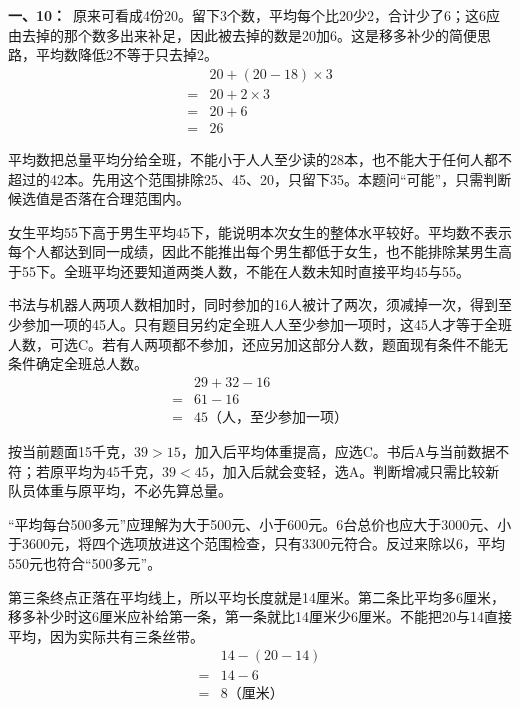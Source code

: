 \documentclass[multi=snippet,border=0pt]{standalone}
\newenvironment{snippet}[3]{\begin{minipage}{#1bp}\color{answerred}\fontsize{#2}{#3}\selectfont\raggedright}{\end{minipage}}
\begin{document}
\begin{snippet}{505}{11.5}{14}\textbf{一、10：}\ 原来可看成4份20。留下3个数，平均每个比20少2，合计少了6；这6应由去掉的那个数多出来补足，因此被去掉的数是20加6。这是移多补少的简便思路，平均数降低2不等于只去掉2。\[\begin{aligned}&20+(20-18)\times3\\={}&20+2\times3\\={}&20+6\\={}&26\end{aligned}\]\end{snippet}
\begin{snippet}{505}{11.5}{14}平均数把总量平均分给全班，不能小于人人至少读的28本，也不能大于任何人都不超过的42本。先用这个范围排除25、45、20，只留下35。本题问“可能”，只需判断候选值是否落在合理范围内。\end{snippet}
\begin{snippet}{505}{11.5}{14}女生平均55下高于男生平均45下，能说明本次女生的整体水平较好。平均数不表示每个人都达到同一成绩，因此不能推出每个男生都低于女生，也不能排除某男生高于55下。全班平均还要知道两类人数，不能在人数未知时直接平均45与55。\end{snippet}
\begin{snippet}{505}{11.5}{14}书法与机器人两项人数相加时，同时参加的16人被计了两次，须减掉一次，得到至少参加一项的45人。只有题目另约定全班人人至少参加一项时，这45人才等于全班人数，可选C。若有人两项都不参加，还应另加这部分人数，题面现有条件不能无条件确定全班总人数。\[\begin{aligned}&29+32-16\\={}&61-16\\={}&45\text{（人，至少参加一项）}\end{aligned}\]\end{snippet}
\begin{snippet}{505}{11.5}{14}按当前题面15千克，\(39>15\)，加入后平均体重提高，应选C。书后A与当前数据不符；若原平均为45千克，\(39<45\)，加入后就会变轻，选A。判断增减只需比较新队员体重与原平均，不必先算总量。\end{snippet}
\begin{snippet}{505}{11.5}{14}“平均每台500多元”应理解为大于500元、小于600元。6台总价也应大于3000元、小于3600元，将四个选项放进这个范围检查，只有3300元符合。反过来除以6，平均550元也符合“500多元”。\end{snippet}
\begin{snippet}{505}{11.5}{14}第三条终点正落在平均线上，所以平均长度就是14厘米。第二条比平均多6厘米，移多补少时这6厘米应补给第一条，第一条就比14厘米少6厘米。不能把20与14直接平均，因为实际共有三条丝带。\[\begin{aligned}&14-(20-14)\\={}&14-6\\={}&8\text{（厘米）}\end{aligned}\]\end{snippet}
\end{document}
